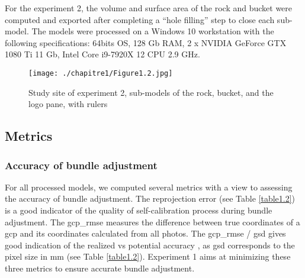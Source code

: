 For the experiment 2, the volume and surface area of the rock and bucket were computed and exported after completing a “hole filling” step to close each sub-model. The models were processed on a Windows 10 workstation with the following specifications: 64bits OS, 128 Gb RAM, 2 x NVIDIA GeForce GTX 1080 Ti 11 Gb, Intel Core i9-7920X 12 CPU 2.9 GHz.

\begin{figure}[H]
	\begin{center}
	\texttt{[image: ./chapitre1/Figure1.2.jpg]}
		\caption[Study site of experiment 2]{Study site of experiment 2, sub-models of the rock, bucket, and the logo pane, with rulers}
	\label{figure1.2}
\end{center}
\end{figure}

\subsection{Metrics}\label{chapitre1_2.3}

\subsubsection{Accuracy of bundle adjustment}\label{chapitre1_2.3.1}
For all processed models, we computed several metrics with a view to assessing the accuracy of bundle adjustment. The reprojection error (see Table \ref{table1.2}) is a good indicator of the quality of self-calibration process during bundle adjustment. The \gls{gcp_rmse} measures the difference between true coordinates of a \gls{gcp} and its coordinates calculated from all photos. The \acrshort{gcp_rmse} / \gls{gsd} gives good indication of the realized vs potential accuracy \citep{forstner_photogrammetric_2016}, as \acrshort{gsd} corresponds to the pixel size in mm (see Table \ref{table1.2}). Experiment 1 aims at minimizing these three metrics to ensure accurate bundle adjustment.


